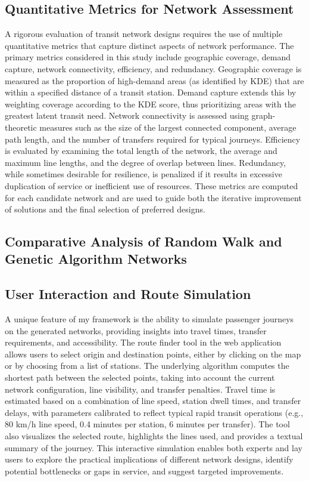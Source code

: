 \documentclass[manuscript,nonacm]{acmart}
\begin{document}
\subsection{Quantitative Metrics for Network Assessment}
A rigorous evaluation of transit network designs requires the use of multiple quantitative metrics that capture distinct aspects of network performance. The primary metrics considered in this study include geographic coverage, demand capture, network connectivity, efficiency, and redundancy. Geographic coverage is measured as the proportion of high-demand areas (as identified by KDE) that are within a specified distance of a transit station. Demand capture extends this by weighting coverage according to the KDE score, thus prioritizing areas with the greatest latent transit need. Network connectivity is assessed using graph-theoretic measures such as the size of the largest connected component, average path length, and the number of transfers required for typical journeys. Efficiency is evaluated by examining the total length of the network, the average and maximum line lengths, and the degree of overlap between lines. Redundancy, while sometimes desirable for resilience, is penalized if it results in excessive duplication of service or inefficient use of resources. These metrics are computed for each candidate network and are used to guide both the iterative improvement of solutions and the final selection of preferred designs.

\subsection{Comparative Analysis of Random Walk and Genetic Algorithm Networks}

\subsection{User Interaction and Route Simulation}
A unique feature of my framework is the ability to simulate passenger journeys on the generated networks, providing insights into travel times, transfer requirements, and accessibility. The route finder tool in the web application allows users to select origin and destination points, either by clicking on the map or by choosing from a list of stations. The underlying algorithm computes the shortest path between the selected points, taking into account the current network configuration, line visibility, and transfer penalties. Travel time is estimated based on a combination of line speed, station dwell times, and transfer delays, with parameters calibrated to reflect typical rapid transit operations (e.g., 80 km/h line speed, 0.4 minutes per station, 6 minutes per transfer). The tool also visualizes the selected route, highlights the lines used, and provides a textual summary of the journey. This interactive simulation enables both experts and lay users to explore the practical implications of different network designs, identify potential bottlenecks or gaps in service, and suggest targeted improvements.
\end{document}
